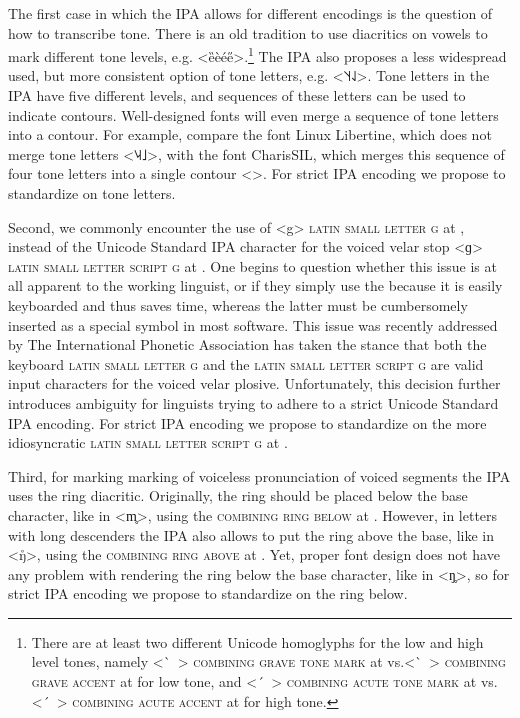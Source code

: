 The first case in which the IPA allows for different encodings is the question
of how to transcribe tone. There is an old tradition to use diacritics on vowels
to mark different tone levels, e.g. <ȅèée̋>.\footnote{There are at least two
different Unicode homoglyphs for the low and high level tones, namely <\ ̀~>
\textsc{combining grave tone mark} at  vs.\@ <\ ̀~> \textsc{combining
grave accent} at  for low tone, and <\ ́~> \textsc{combining acute tone
mark} at  vs.\@ <\ ́~> \textsc{combining acute accent} at 
for high tone.} The IPA also proposes a less widespread used, but more
consistent option of tone letters, e.g. <˥˦˧˨˩>. Tone letters in the IPA have
five different levels, and sequences of these letters can be used to indicate
contours. Well-designed fonts will even merge a sequence of tone letters into a
contour. For example, compare the font Linux Libertine, which does not merge
tone letters <{˥˨˧˩}>, with the font CharisSIL, which
merges this sequence of four tone letters into a single contour <>.
For strict IPA encoding we propose to standardize on tone letters.

Second, we commonly encounter the use of <g> \textsc{latin small letter g} at
, instead of the Unicode Standard IPA character for the voiced velar
stop <ɡ> \textsc{latin small letter script g} at . One begins to
question whether this issue is at all apparent to the working linguist, or if
they simply use the  because it is easily keyboarded and thus saves
time, whereas the latter must be cumbersomely inserted as a special symbol in
most software. This issue was recently addressed by The International Phonetic
Association has taken the stance that both the keyboard \textsc{latin small
letter g} and the \textsc{latin small letter script g} are valid input
characters for the voiced velar plosive. Unfortunately, this decision further
introduces ambiguity for linguists trying to adhere to a strict Unicode Standard
IPA encoding. For strict IPA encoding we propose to standardize on the more 
idiosyncratic \textsc{latin small letter script g} at .

Third, for marking marking of voiceless pronunciation of voiced segments the IPA
uses the ring diacritic. Originally, the ring should be placed below the 
base character, like in <m̥>, using the \textsc{combining ring below} at . 
However, in letters with long descenders the IPA also allows to put the ring 
above the base, like in <ŋ̊>, using the \textsc{combining ring above} at 
. Yet, proper font design does not have any problem with rendering 
the ring below the base character, like in <ŋ̥>, so for strict IPA encoding we 
propose to standardize on the ring below.
 
